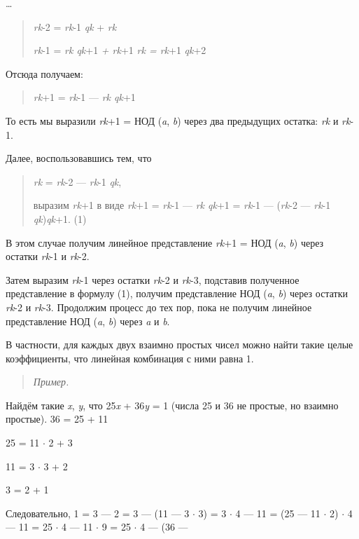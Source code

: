 \documentclass[12pt]{article}
\begin{document}
    \ldots{}

    \begin{quote}
        \emph{rk}-2 = \emph{rk}-1 \emph{qk} + \emph{rk}

        \emph{rk}-1 = \emph{rk qk}+1 \emph{+ rk}+1 \emph{rk = rk}+1 \emph{qk}+2
    \end{quote}

    Отсюда получаем:

    \begin{quote}
        \emph{rk}+1 = \emph{rk}-1 --- \emph{rk qk}+1
    \end{quote}

    То есть мы выразили \emph{rk}+1 = НОД (\emph{a}, \emph{b}) через два
    предыдущих остатка: \emph{rk} и \emph{rk}-1.

    Далее, воспользовавшись тем, что

    \begin{quote}
        \emph{rk} = \emph{rk}-2 --- \emph{rk}-1 \emph{qk},

        выразим \emph{rk}+1 в виде \emph{rk}+1 = \emph{rk}-1 --- \emph{rk qk}+1 =
        \emph{rk}-1 --- (\emph{rk}-2 --- \emph{rk}-1 \emph{qk})\emph{qk}+1. (1)
    \end{quote}

    В этом случае получим линейное представление \emph{rk}+1 = НОД
    (\emph{a}, \emph{b}) через остатки \emph{rk}-1 и \emph{rk}-2.

    Затем выразим \emph{rk}-1 через остатки \emph{rk}-2 и \emph{rk}-3,
    подставив полученное представление в формулу (1), получим представление
    НОД (\emph{a}, \emph{b}) через остатки \emph{rk}-2 и \emph{rk}-3.
    Продолжим процесс до тех пор, пока не получим линейное представление НОД
    (\emph{a}, \emph{b}) через \emph{a} и \emph{b}.

    В частности, для каждых двух взаимно простых чисел можно найти такие
    целые коэффициенты, что линейная комбинация с ними равна 1.

    \begin{quote}
        \emph{Пример.}
    \end{quote}

    Найдём такие \emph{x}, \emph{y}, что 25\emph{x} + 36\emph{y} = 1 (числа
    25 и 36 не простые, но взаимно простые). 36 = 25 + 11

    25 = 11 $\cdot$ 2 + 3

    11 = 3 $\cdot$ 3 + 2

    3 = 2 + 1

    Следовательно, 1 = 3 --- 2 = 3 --- (11 --- 3 $\cdot$ 3) = 3 $\cdot$ 4 --- 11 = (25 --- 11
    $\cdot$ 2) $\cdot$ 4 --- 11 = 25 $\cdot$ 4 --- 11 $\cdot$ 9 = 25 $\cdot$ 4 --- (36 ---
\end{document}
